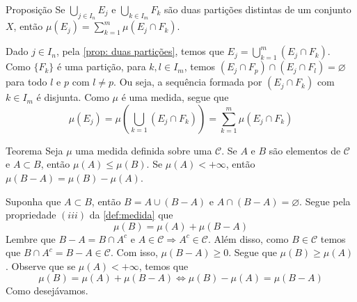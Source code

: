 
\begin{comment}
	\begin{env}{Exemplo}
		Seja $X = \N$ e $\mathcal{C}$ sendo o conjunto das partes de $\N$. 
		para $A \in \mathcal{C}$, definimos $\mu(A)$ por meio da sua cardinalidade, isto é, se $A$ é finito, então $\mu(A)$ é quantidade de elementos de $A$. Caso contrário, $\mu(A) = +\infty$.	
	\end{env}
\end{comment}


\begin{env}{Proposição}
	\label{prop: medida com partição}
	Se $\displaystyle \bigcup_{j \in I_n} E_j$ e $\displaystyle\bigcup_{k \in I_m} F_k$ são duas partições distintas de um conjunto $X$, então 
	$\displaystyle \mu(E_j) 
	= 
	\sum_{k = 1}^{m} \mu(E_j\cap F_k)$.
\end{env}

\begin{prova}
	Dado $j \in I_n$, pela \ref{prop: duas partições}, temos que
	$E_j = \displaystyle \bigcup_{k = 1}^m (E_j\cap F_k)$.
	Como $\{F_k\}$ é uma partição, para $k,l \in I_m$, temos
	$(E_j\cap F_p) \cap (E_j\cap F_l) = \varnothing$ para todo $l$ e $p$ com  $l \neq p$.
	Ou seja, a sequência formada por $(E_j\cap F_k)$ com $k \in I_m$ é disjunta.
	Como $\mu$ é uma medida, segue que
	$$
	\mu(E_j)
	=
	\mu\left(\bigcup_{k = 1} (E_j\cap F_k)\right)
	=
	\sum_{k = 1}^{m}\mu(E_j\cap F_k)
	$$
	\vspace{-1cm}
\end{prova}
\begin{env}{Teorema}
\label{teo:medida-diferença}
	Seja $\mu$ uma medida definida sobre uma \sigal $\mathcal{C}$.
	Se $A$ e $B$ são elementos de $\mathcal{C}$ e $A \subset B$, então $\mu(A) \leq \mu(B)$.
	Se $\mu(A) < +\infty$, então $\mu(B-A) = \mu(B) - \mu(A)$.
\end{env}
\begin{prova}
	Suponha que $A \subset B$, então $B = A \cup (B - A)$ e $A \cap (B - A) = \varnothing$. Segue pela propriedade $(iii)$ da \ref{def:medida} que 
	$$\mu(B) = \mu(A) + \mu(B-A)$$
	Lembre que $B-A = B\cap A^c$ e $A \in \mathcal{C} \Rightarrow A^c \in \mathcal{C}$.
	Além disso, como $B \in \mathcal{C}$ temos que $ B\cap A^c = B - A \in \mathcal{C}$.
	Com isso, $\mu(B-A) \geq 0$.
	Segue que $\mu(B) \geq \mu(A)$.
	Observe que se $\mu(A) < +\infty$, temos que 
	$$\mu(B) = \mu(A) + \mu(B-A) 
	 \Leftrightarrow \mu(B) - \mu(A) =  \mu(B-A)
 	$$
Como desejávamos.
\end{prova}

